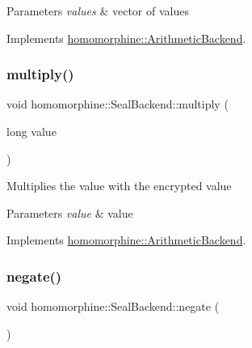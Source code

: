 \begin{DoxyParams}{Parameters}
{\em values} & vector of values \\
\hline
\end{DoxyParams}


Implements \mbox{\hyperlink{classhomomorphine_1_1_arithmetic_backend_a80f2424d26fcfad4803f6a0e5a9cdd2d}{homomorphine\+::\+Arithmetic\+Backend}}.

\mbox{\label{classhomomorphine_1_1_seal_backend_afd8f13068d81c0038b966df4219e8033}} 
\subsubsection{\texorpdfstring{multiply()}{multiply()}\hspace{0.1cm}{\footnotesize\ttfamily [2/2]}}
{\footnotesize\ttfamily void homomorphine\+::\+Seal\+Backend\+::multiply (\begin{DoxyParamCaption}\item[{long}]{value }\end{DoxyParamCaption})\hspace{0.3cm}{\ttfamily [virtual]}}

Multiplies the value with the encrypted value


\begin{DoxyParams}{Parameters}
{\em value} & value \\
\hline
\end{DoxyParams}


Implements \mbox{\hyperlink{classhomomorphine_1_1_arithmetic_backend_a22f4c598c5a3987ef6efe5925f4c5b81}{homomorphine\+::\+Arithmetic\+Backend}}.

\mbox{\label{classhomomorphine_1_1_seal_backend_a9064cf9822de85af9120528cef084bea}} 
\subsubsection{\texorpdfstring{negate()}{negate()}}
{\footnotesize\ttfamily void homomorphine\+::\+Seal\+Backend\+::negate (\begin{DoxyParamCaption}{ }\end{DoxyParamCaption})\hspace{0.3cm}{\ttfamily [virtual]}}

